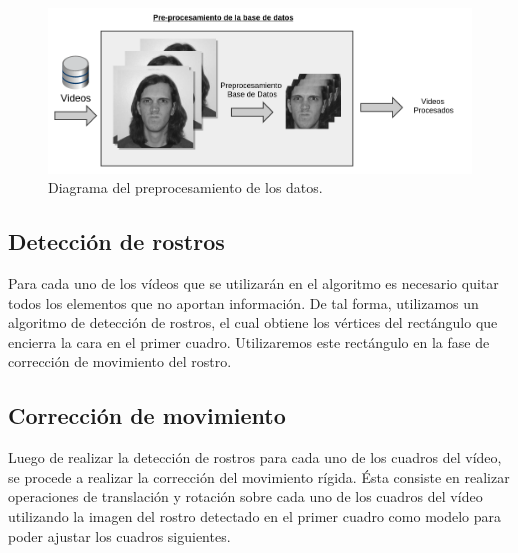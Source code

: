 	\begin{figure}[tb]
		\centering
    		\includegraphics[width=1\textwidth]{Figuras/Diagramas/Preprocesamiento.png}
  		\caption{Diagrama del preprocesamiento de los datos.}
  		\label{algoritmo:fig:preprocesamiento}
	\end{figure}	

	
	\subsection{Detección de rostros}
	\label{algoritmo:det_rostro}
	Para cada uno de los vídeos que se utilizarán en el algoritmo es necesario quitar todos los elementos que no aportan información. De tal forma, utilizamos un algoritmo de detección de rostros, el cual obtiene los vértices del rectángulo que encierra la cara en el primer cuadro. Utilizaremos este rectángulo en la fase de corrección de movimiento del rostro. 
		
	\subsection{Corrección de movimiento}
	\label{algoritmo:cor_movimiento}
	Luego de realizar la detección de rostros para cada uno de los cuadros del vídeo, se procede a realizar la corrección del movimiento rígida. Ésta consiste en realizar operaciones de translación y rotación sobre cada uno de los cuadros del vídeo utilizando la imagen del rostro detectado en el primer cuadro como modelo para poder ajustar los cuadros siguientes.


